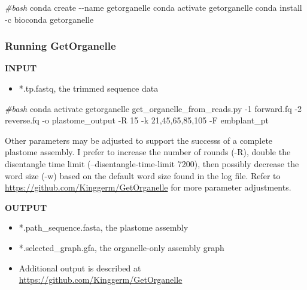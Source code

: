 \documentclass[
  12pt,
]{article}
\newenvironment{Shaded}{\begin{snugshade}}{\end{snugshade}}
\newcommand{\AttributeTok}[1]{\textcolor[rgb]{0.13,0.29,0.53}{#1}}
\newcommand{\CommentTok}[1]{\textcolor[rgb]{0.56,0.35,0.01}{\textit{#1}}}
\newcommand{\ExtensionTok}[1]{#1}
\newcommand{\NormalTok}[1]{#1}
\providecommand{\tightlist}{%
  \setlength{\itemsep}{0pt}\setlength{\parskip}{0pt}}
\begin{document}
\begin{Shaded}
\begin{Highlighting}[]
\CommentTok{\#bash}
\ExtensionTok{conda}\NormalTok{ create }\AttributeTok{{-}{-}name}\NormalTok{ getorganelle}
\ExtensionTok{conda}\NormalTok{ activate getorganelle}
\ExtensionTok{conda}\NormalTok{ install }\AttributeTok{{-}c}\NormalTok{ bioconda getorganelle}
\end{Highlighting}
\end{Shaded}

\hypertarget{running-getorganelle}{%
\subsubsection{Running GetOrganelle}\label{running-getorganelle}}

\textbf{INPUT}

\begin{itemize}
\tightlist
\item
  *.tp.fastq, the trimmed sequence data
\end{itemize}

\begin{Shaded}
\begin{Highlighting}[]
\CommentTok{\#bash}
\ExtensionTok{conda}\NormalTok{ activate getorganelle}
\ExtensionTok{get\_organelle\_from\_reads.py} \AttributeTok{{-}1}\NormalTok{ forward.fq }\AttributeTok{{-}2}\NormalTok{ reverse.fq }\AttributeTok{{-}o}\NormalTok{ plastome\_output }\AttributeTok{{-}R}\NormalTok{ 15 }\AttributeTok{{-}k}\NormalTok{ 21,45,65,85,105 }\AttributeTok{{-}F}\NormalTok{ embplant\_pt}
\end{Highlighting}
\end{Shaded}

Other parameters may be adjusted to support the successs of a complete plastome assembly. I prefer to increase the number of rounds (-R), double the disentangle time limit (--disentangle-time-limit 7200), then possibly decrease the word size (-w) based on the default word size found in the log file. Refer to \url{https://github.com/Kinggerm/GetOrganelle} for more parameter adjustments.

\textbf{OUTPUT}

\begin{itemize}
\tightlist
\item
  *.path\_sequence.fasta, the plastome assembly
\item
  *.selected\_graph.gfa, the organelle-only assembly graph
\item
  Additional output is described at \url{https://github.com/Kinggerm/GetOrganelle}
\end{itemize}
\end{document}
